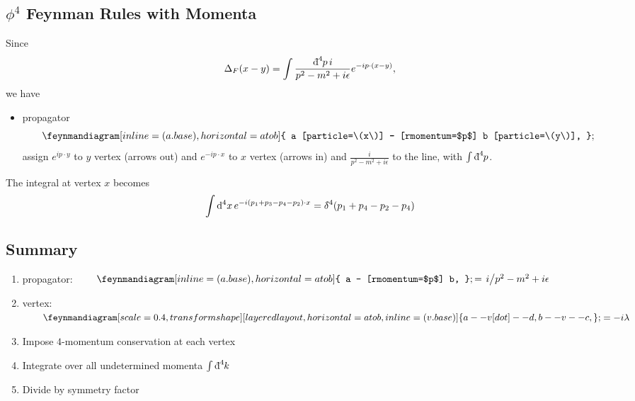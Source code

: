 \subsection{\texorpdfstring{$\phi^4$}{Phi four} Feynman Rules with Momenta}%
\label{sub:$phi^4$_phi_four_feynman_rules_with_momenta}

Since 
\begin{equation}
  \Delta_F(x - y) = \int \frac{\bdd[4]{p} i}{p^2 - m^2 + i\epsilon} e^{-i p \cdot (x - y)},
\end{equation}
we have
\begin{itemize}
  \item propagator
    \begin{equation}
      \feynmandiagram[inline=(a.base), horizontal=a to b] {
	a [particle=\(x\)] -- [rmomentum=$p$] b [particle=\(y\)],
      };
    \end{equation}
    assign $e^{i p \cdot y}$ to $y$ vertex (arrows out) and $e^{-i p \cdot x}$ to $x$ vertex (arrows in) and $\frac{i}{p^2 - m^2 + i \epsilon}$ to the line, with $\int \bdd[4]{p}$.
\end{itemize}
The integral at vertex $x$ 
becomes
\begin{equation}
  \int \dd[4]{x} e^{-i (p_1 + p_3 - p_4 - p_2) \cdot x} = \bdelta^4(p_1 + p_4 - p_2 - p_4)
\end{equation}

\subsection*{Summary}%

\begin{enumerate}
  \item propagator: \( \qquad
    \feynmandiagram[inline=(a.base), horizontal=a to b] {
      a -- [rmomentum=$p$] b,
    };
    = \flatfrac{i}{p^2 - m^2 + i \epsilon}
    \)
  \item vertex: \(\qquad
    \begin{gathered}
      \feynmandiagram[scale=0.4, transform shape][layered layout, horizontal=a to b, inline=(v.base)]{
        a -- v [dot] -- d,
        b -- v -- c,
      };
    \end{gathered}
    = -i \lambda \)
  \item Impose $4$-momentum conservation at each vertex
  \item Integrate over all undetermined momenta $\int \bdd[4]{k}$
  \item Divide by symmetry factor
\end{enumerate}

